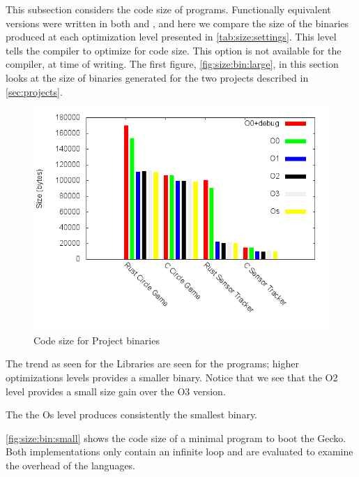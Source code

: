 This subsection considers the code size of programs.
Functionally equivalent versions were written in both {\rust} and {\C}, and here we compare the size of the binaries produced at each optimization level presented in \autoref{tab:size:settings}.
This level tells the compiler to optimize for code size.
This option is not available for the {\rust} compiler, at time of writing.
The first figure, \autoref{fig:size:bin:large}, in this section looks at the size of binaries generated for the two projects described in \autoref{sec:projects}.

\begin{figure}[H]
  \begin{center}
    \includegraphics[scale=0.5]{results/plots/size/bin/large/size.png}
  \end{center}
  \caption{Code size for Project binaries}
  \label{fig:size:bin:large}
\end{figure}

The trend as seen for the Libraries are seen for the {\rust} programs; higher optimizations levels provides a smaller binary.
Notice that we see that the O2 level provides a small size gain over the O3 version.

The the Os {\C} level produces consistently the smallest binary.

\autoref{fig:size:bin:small} shows the code size of a minimal program to boot the Gecko.
Both implementations only contain an infinite loop and are evaluated to examine the overhead of the languages.


